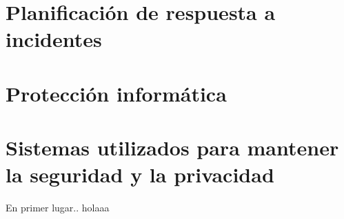 \chapter{Planificación de respuesta a incidentes}
\label{cha:planificacion-de-respuesta}



\chapter{Protección informática}
\label{cha:proteccion-informatica}



\chapter{Sistemas utilizados para mantener la seguridad y la privacidad}
\label{cha:tipos-sistemas}

En primer lugar.\cite{rstudio}. holaaa






\nocite{ransomware}
\nocite{sql_injection}
\nocite{vulnerabilidades}
\nocite{vulnerabilidades2}
\nocite{wikip}
\nocite{comision_europea}
\nocite{isot}
\nocite{gestion_activos}
\nocite{incibe2}
\nocite{herramientas-evaluacion-riesgos}
\nocite{bibdigital}
\nocite{bibdigital}





